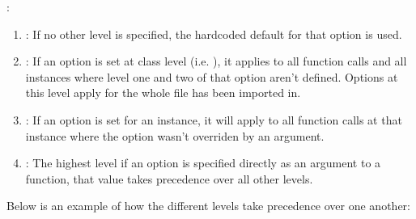 \documentclass[a4paper,10pt,english]{sphinxmanual}
\begin{document}
\sphinxAtStartPar
{}:
\begin{enumerate}
%
\item {}
\sphinxAtStartPar
{}: If no other level is specified, the hardcoded default for that option is used.

\item {}
\sphinxAtStartPar
{}: If an option is set at class level (i.e. ), it applies to all function calls and all instances where level one and two of that option aren’t defined. Options at this level apply for the whole file  has been imported in.

\item {}
\sphinxAtStartPar
{}: If an option is set for an instance, it will apply to all function calls at that instance where the option wasn’t overriden by an argument.

\item {}
\sphinxAtStartPar
{}: The highest level \sphinxhyphen{} if an option is specified directly as an argument to a function, that value takes precedence over all other levels.

\end{enumerate}

\sphinxAtStartPar
Below is an example of how the different levels take precedence over one another:
\end{document}
